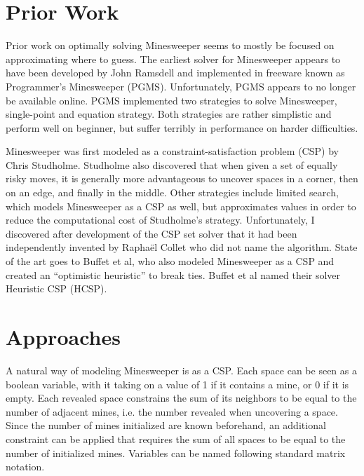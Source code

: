 \documentclass[letterpaper]{article}
\begin{document}
\section{Prior Work}
Prior work on optimally solving Minesweeper seems to mostly be focused on approximating where to guess.  The earliest solver for Minesweeper appears to have been developed by John Ramsdell and implemented in freeware known as Programmer's Minesweeper (PGMS).  Unfortunately, PGMS appears to no longer be available online.  PGMS implemented two strategies to solve Minesweeper, single-point and equation strategy.  Both strategies are rather simplistic and perform well on beginner, but suffer terribly in performance on harder difficulties.

Minesweeper was first modeled as a constraint-satisfaction problem (CSP) by Chris Studholme.  Studholme also discovered that when given a set of equally risky moves, it is generally more advantageous to uncover spaces in a corner, then on an edge, and finally in the middle.  Other strategies include limited search, which models Minesweeper as a CSP as well, but approximates values in order to reduce the computational cost of Studholme's strategy.  Unfortunately, I discovered after development of the CSP set solver that it had been independently invented by Rapha\"el Collet who did not name the algorithm.  State of the art goes to Buffet et al, who also modeled Minesweeper as a CSP and created an ``optimistic heuristic'' to break ties.  Buffet et al named their solver Heuristic CSP (HCSP).

\section{Approaches}
A natural way of modeling Minesweeper is as a CSP.  Each space can be seen as a boolean variable, with it taking on a value of 1 if it contains a mine, or 0 if it is empty.  Each revealed space constrains the sum of its neighbors to be equal to the number of adjacent mines, i.e. the number revealed when uncovering a space.  Since the number of mines initialized are known beforehand, an additional constraint can be applied that requires the sum of all spaces to be equal to the number of initialized mines.  Variables can be named following standard matrix notation.
\end{document}

